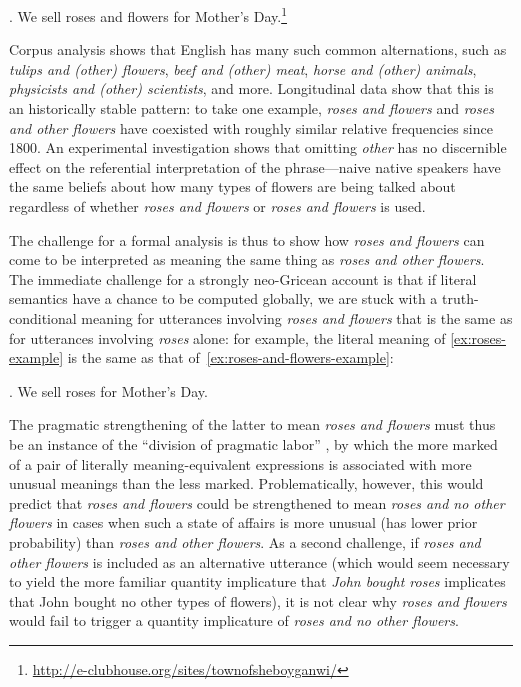 \documentclass[11pt]{article}
\begin{document}
\ex. We sell roses and flowers for Mother's
Day.\footnote{\url{http://e-clubhouse.org/sites/townofsheboyganwi/}} \label{ex:roses-and-flowers-example}

Corpus analysis shows that English has many such common alternations,
such as \emph{tulips and (other) flowers}, \emph{beef and (other)
  meat}, \emph{horse and (other) animals}, \emph{physicists and (other)
  scientists}, and more.  Longitudinal data show that this is an
historically stable pattern: to take one example, \emph{roses and
  flowers} and \emph{roses and other flowers} have coexisted with
roughly similar relative frequencies since 1800.  An experimental
investigation shows that omitting \emph{other} has no discernible
effect on the referential interpretation of the phrase---naive native
speakers have the same beliefs about how many types of flowers are
being talked about regardless of whether \emph{roses and flowers} or
\emph{roses and flowers} is used.

The challenge for a formal analysis is thus to show how \emph{roses
  and flowers} can come to be interpreted as meaning the same thing as
\emph{roses and other flowers}.  The immediate challenge for a
strongly neo-Gricean account is that if literal semantics have a
chance to be computed globally, we are stuck with a truth-conditional
meaning for utterances involving \emph{roses and flowers} that is the
same as for utterances involving \emph{roses} alone: for example, the
literal meaning of \ref{ex:roses-example} is the same as that
of~\ref{ex:roses-and-flowers-example}:

\ex. We sell roses for Mother's Day. \label{ex:roses-example}

\noindent
The pragmatic strengthening of the latter to mean \emph{roses and
  flowers} must thus be an instance of the ``division of pragmatic
labor'' \citep{horn:1984}, by which the more marked of a pair of
literally meaning-equivalent expressions is associated with more
unusual meanings than the less marked.  Problematically, however, this
would predict that \emph{roses and flowers} could be strengthened to
mean \emph{roses and no other flowers} in cases when such a state of
affairs is more unusual (has lower prior probability) than \emph{roses
  and other flowers}.  As a second challenge, if \emph{roses and other
  flowers} is included as an alternative utterance (which would seem
necessary to yield the more familiar quantity implicature that
\emph{John bought roses} implicates that John bought no other types of
flowers), it is not clear why \emph{roses and flowers} would fail to
trigger a quantity implicature of \emph{roses and no other flowers}.
\end{document}
